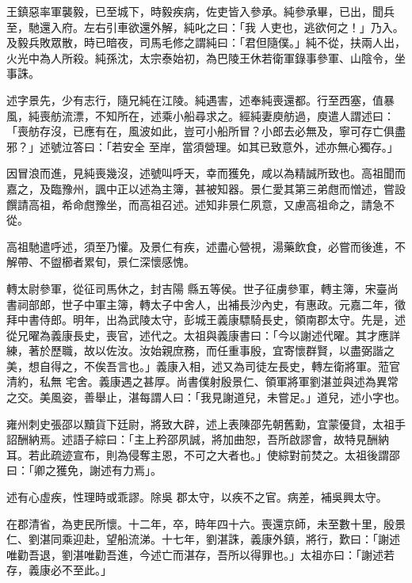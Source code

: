 \begin{pinyinscope}
 王鎮惡率軍襲毅，已至城下，時毅疾病，佐吏皆入參承。純參承畢，已出，聞兵至，馳還入府。左右引車欲還外解，純叱之曰：「我
 人吏也，逃欲何之！」乃入。及毅兵敗眾散，時已暗夜，司馬毛修之謂純曰：「君但隨僕。」純不從，扶兩人出，火光中為人所殺。純孫沈，太宗泰始初，為巴陵王休若衛軍錄事參軍、山陰令，坐事誅。



 述字景先，少有志行，隨兄純在江陵。純遇害，述奉純喪還都。行至西塞，值暴風，純喪舫流漂，不知所在，述乘小船尋求之。經純妻庾舫過，庾遣人謂述曰：「喪舫存沒，已應有在，風波如此，豈可小船所冒？小郎去必無及，寧可存亡俱盡邪？」述號泣答曰：「若安全
 至岸，當須營理。如其已致意外，述亦無心獨存。」



 因冒浪而進，見純喪幾沒，述號叫呼天，幸而獲免，咸以為精誠所致也。高祖聞而嘉之，及臨豫州，諷中正以述為主簿，甚被知器。景仁愛其第三弟甝而憎述，嘗設饌請高祖，希命甝豫坐，而高祖召述。述知非景仁夙意，又慮高祖命之，請急不從。



 高祖馳遣呼述，須至乃懽。及景仁有疾，述盡心營視，湯藥飲食，必嘗而後進，不解帶、不盥櫛者累旬，景仁深懷感愧。



 轉太尉參軍，從征司馬休之，封吉陽
 縣五等侯。世子征虜參軍，轉主簿，宋臺尚書祠部郎，世子中軍主簿，轉太子中舍人，出補長沙內史，有惠政。元嘉二年，徵拜中書侍郎。明年，出為武陵太守，彭城王義康驃騎長史，領南郡太守。先是，述從兄曜為義康長史，喪官，述代之。太祖與義康書曰：「今以謝述代曜。其才應詳練，著於歷職，故以佐汝。汝始親庶務，而任重事殷，宜寄懷群賢，以盡弼諧之美，想自得之，不俟吾言也。」義康入相，述又為司徒左長史，轉左衛將軍。蒞官清約，私無
 宅舍。義康遇之甚厚。尚書僕射殷景仁、領軍將軍劉湛並與述為異常之交。美風姿，善舉止，湛每謂人曰：「我見謝道兒，未嘗足。」道兒，述小字也。



 雍州刺史張邵以黷貨下廷尉，將致大辟，述上表陳邵先朝舊勳，宜蒙優貸，太祖手詔酬納焉。述語子綜曰：「主上矜邵夙誠，將加曲恕，吾所啟謬會，故特見酬納耳。若此疏迹宣布，則為侵奪主恩，不可之大者也。」使綜對前焚之。太祖後謂邵曰：「卿之獲免，謝述有力焉」。



 述有心虛疾，性理時或乖謬。除吳
 郡太守，以疾不之官。病差，補吳興太守。



 在郡清省，為吏民所懷。十二年，卒，時年四十六。喪還京師，未至數十里，殷景仁、劉湛同乘迎赴，望船流涕。十七年，劉湛誅，義康外鎮，將行，歎曰：「謝述唯勸吾退，劉湛唯勸吾進，今述亡而湛存，吾所以得罪也。」太祖亦曰：「謝述若存，義康必不至此。」




\end{pinyinscope}
